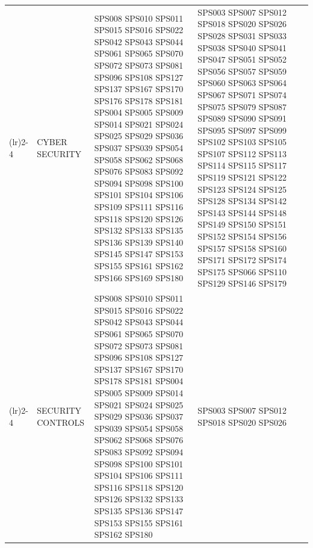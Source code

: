\begin{table}[htbp]
\begin{tabularx}{\textwidth}{p{0.5cm}p{1.5cm}>{\raggedright\arraybackslash}X>{\raggedright\arraybackslash}X>{\raggedright\arraybackslash}X}
		\addlinespace[0.3em]
		\cmidrule(lr){2-4}				  
		                                      & CYBER
											  	SECURITY         	& SPS008 SPS010 SPS011 SPS015 SPS016 SPS022 
																		  SPS042 SPS043 SPS044 SPS061 SPS065 SPS070 
																		  SPS072 SPS073 SPS081 SPS096 SPS108 SPS127 
																		  SPS137 SPS167 SPS170 SPS176 SPS178 SPS181	
																		  SPS004 SPS005 SPS009 SPS014 SPS021 SPS024 
																		  SPS025 SPS029 SPS036 SPS037 SPS039 SPS054 
																		  SPS058 SPS062 SPS068 SPS076 SPS083 SPS092 
																		  SPS094 SPS098 SPS100 SPS101 SPS104 SPS106 
																		  SPS109 SPS111 SPS116 SPS118 SPS120 SPS126 
																		  SPS132 SPS133 SPS135 SPS136 SPS139 SPS140 
																		  SPS145 SPS147 SPS153 SPS155 SPS161 SPS162 
																		  SPS166 SPS169 SPS180                       & SPS003 SPS007 SPS012 SPS018 SPS020 SPS026 
																													   SPS028 SPS031 SPS033 SPS038 SPS040 SPS041 
																													   SPS047 SPS051 SPS052 SPS056 SPS057 SPS059 
																													   SPS060 SPS063 SPS064 SPS067 SPS071 SPS074 
																													   SPS075 SPS079 SPS087 SPS089 SPS090 SPS091 
																													   SPS095 SPS097 SPS099 SPS102 SPS103 SPS105 
																													   SPS107 SPS112 SPS113 SPS114 SPS115 SPS117 
																													   SPS119 SPS121 SPS122 SPS123 SPS124 SPS125 
																													   SPS128 SPS134 SPS142 SPS143 SPS144 SPS148 
																													   SPS149 SPS150 SPS151 SPS152 SPS154 SPS156 
																													   SPS157 SPS158 SPS160 SPS171 SPS172 SPS174 
																													   SPS175 SPS066 SPS110 SPS129 SPS146 SPS179 \\
		\addlinespace[0.3em]
		\cmidrule(lr){2-4}
		                                      & SECURITY
											  	 CONTROLS       & SPS008 SPS010 SPS011 SPS015 SPS016 SPS022 
																		  SPS042 SPS043 SPS044 SPS061 SPS065 SPS070 
																		  SPS072 SPS073 SPS081 SPS096 SPS108 SPS127 
																		  SPS137 SPS167 SPS170 SPS178 SPS181 SPS004 
																		  SPS005 SPS009 SPS014 SPS021 SPS024 SPS025 
																		  SPS029 SPS036 SPS037 SPS039 SPS054 SPS058 
																		  SPS062 SPS068 SPS076 SPS083 SPS092 SPS094 
																		  SPS098 SPS100 SPS101 SPS104 SPS106 SPS111 
																		  SPS116 SPS118 SPS120 SPS126 SPS132 SPS133 
																		  SPS135 SPS136 SPS147 SPS153 SPS155 SPS161 
																		  SPS162 SPS180                               & SPS003 SPS007 SPS012 SPS018 SPS020 SPS026 

\end{tabularx}
\end{table}

